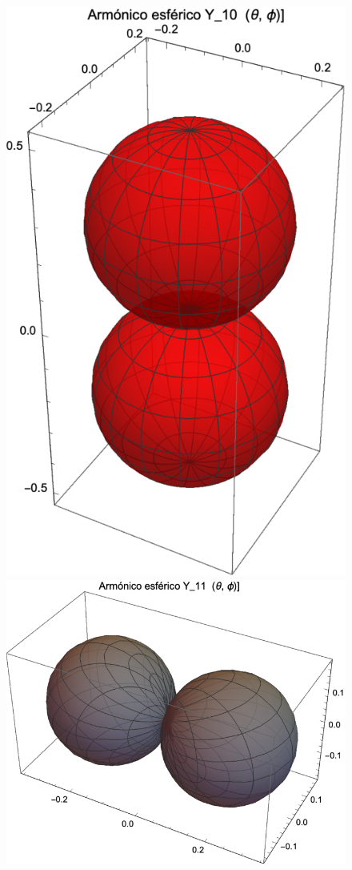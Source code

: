 \newpage
\begin{figure}[H]
    \centering
    \includegraphics[scale=1]{Imagenes/Armonicos_Esfericos_10.eps}
    
    \includegraphics[scale=1]{Imagenes/Armonicos_Esfericos_11.eps}
\end{figure}
